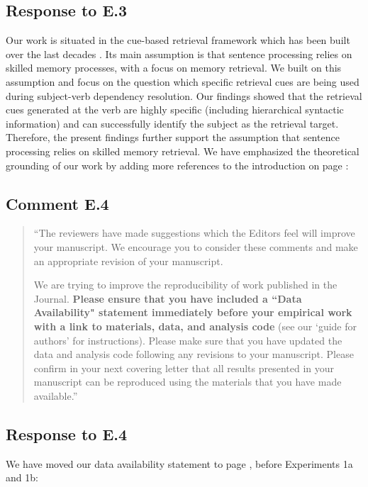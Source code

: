 \documentclass[12pt]{article}
\begin{document}
\subsection*{Response to E.3}
Our work is situated in the cue-based retrieval framework which has been built over the last decades \citep{Lewis2005, mcelree}. Its main assumption is that sentence processing relies on skilled memory processes, with a focus on memory retrieval. We built on this assumption and focus on the question which specific retrieval cues are being used during subject-verb dependency resolution. Our findings showed that the retrieval cues generated at the verb are highly specific (including hierarchical syntactic information) and can successfully identify the subject as the retrieval target. Therefore, the present findings further support the assumption that sentence processing relies on skilled memory retrieval. We have emphasized the theoretical grounding of our work by adding more references to the introduction on page \pageref{intro}:

\begin{quote}
\end{quote}

\subsection*{Comment E.4}
\begin{quote}
``The reviewers have made suggestions which the Editors feel will improve your manuscript. We encourage you to consider these comments and make an appropriate revision of your manuscript.

We are trying to improve the reproducibility of work published in the Journal. \textbf{Please ensure that you have included a ``Data Availability" statement immediately before your empirical work with a link to materials, data, and analysis code} (see our `guide for authors' for instructions). Please make sure that you have updated the data and analysis code following any revisions to your manuscript. Please confirm in your next covering letter that all results presented in your manuscript can be reproduced using the materials that you have made available.''
\end{quote}

\subsection*{Response to E.4}
We have moved our data availability statement to page \pageref{statement}, before Experiments 1a and 1b:
\end{document}
